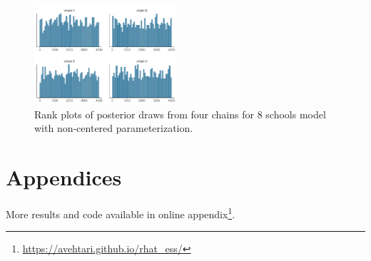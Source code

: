 \documentclass[american,]{article}
\providecommand{\tightlist}{%
  \setlength{\itemsep}{0pt}\setlength{\parskip}{0pt}}
\let\rmarkdownfootnote\footnote%
\def\footnote{\protect\rmarkdownfootnote}
\begin{document}
\begin{figure}[tp]
  \centering
  \includegraphics[width=0.47\textwidth]{graphics/hist-fit-ncp2-1.pdf}
  \caption{Rank plots of posterior draws from four chains for 8 schools model with non-centered parameterization.}
  \label{fig:hist-fit-ncp2-1}
\end{figure}





\hypertarget{appendices}{%
\section*{Appendices}\label{appendices}}

More results and code available in online
appendix\footnote{\url{https://avehtari.github.io/rhat_ess/}}.



\end{document}
